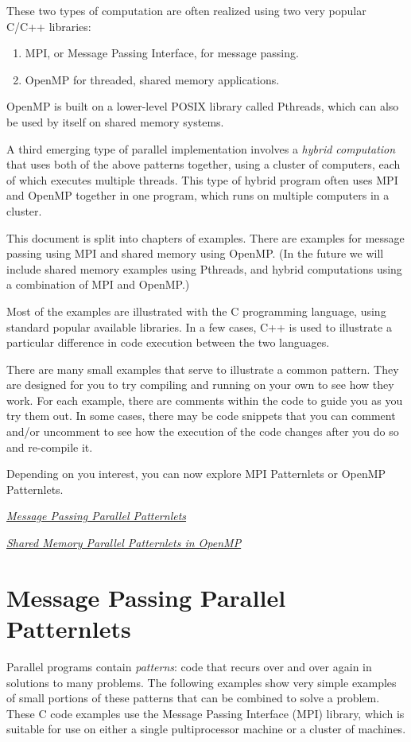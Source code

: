 \documentclass[letterpaper,10pt,openany,oneside]{sphinxmanual}
\begin{document}
These two types of computation are often realized using two very popular C/C++ libraries:
\begin{enumerate}
\item {} 
MPI, or Message Passing Interface, for message passing.

\item {} 
OpenMP for threaded, shared memory applications.

\end{enumerate}

OpenMP is built on a lower-level POSIX library called Pthreads, which can also be used by itself on shared memory systems.

A third emerging type of parallel implementation involves a \emph{hybrid computation} that uses both of the above patterns together, using a cluster of computers, each of which executes multiple threads.  This type of hybrid program often uses MPI and OpenMP together in one program, which runs on multiple computers in a cluster.

This document is split into chapters of examples.  There are examples for message passing using MPI and shared memory using OpenMP.
(In the future we will include shared memory examples using Pthreads, and hybrid computations using a combination of MPI and OpenMP.)

Most of the examples are illustrated
with the C programming language, using standard popular available libraries. In a few cases, C++
is used to illustrate a particular difference in code execution between the two languages.

There are many small examples that serve to illustrate a common pattern.  They are designed for you to try compiling and running on your own to see how they work.  For each example, there are comments within the code to guide you as you try them out.  In some cases, there may be code snippets that you can comment and/or uncomment to see how the execution of the code changes after you do so and re-compile it.

Depending on you interest, you can now explore MPI Patternlets or OpenMP Patternlets.

{\hyperref[MessagePassing/MPI_Patternlets::doc]{\emph{Message Passing Parallel Patternlets}}}

{\hyperref[SharedMemory/OpenMP_Patternlets::doc]{\emph{Shared Memory Parallel Patternlets in OpenMP}}}


\chapter{Message Passing Parallel Patternlets}
\label{MessagePassing/MPI_Patternlets:message-passing-parallel-patternlets}\label{MessagePassing/MPI_Patternlets::doc}
Parallel programs contain \emph{patterns}:  code that recurs over and over again
in solutions to many problems.  The following examples show very simple
examples of small portions of
these patterns that can be combined to solve a problem.  These C code examples use the
Message Passing Interface (MPI) library, which is suitable for use on either a
single pultiprocessor machine or a cluster
of machines.
\end{document}
